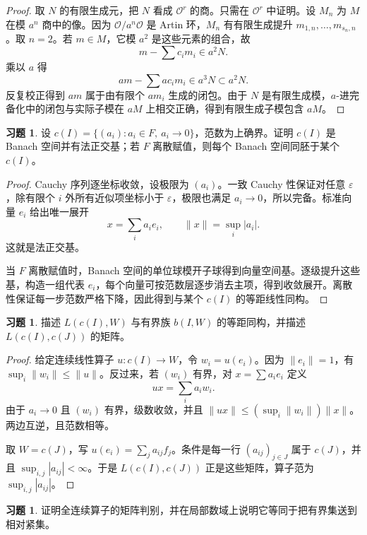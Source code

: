 \documentclass[11pt,a4paper,openany]{ctexbook}
\numberwithin{equation}{chapter}
\theoremstyle{plain}
\theoremstyle{definition}
\newtheorem{exercise}[theorem]{习题}
\theoremstyle{remark}
\begin{document}
\begin{proof}
取 $N$ 的有限生成元，把 $N$ 看成 $\mathcal O^r$ 的商。只需在 $\mathcal O^r$ 中证明。设 $M_n$ 为 $M$ 在模 $a^n$ 商中的像。因为 $\mathcal O/a^n\mathcal O$ 是 Artin 环，$M_n$ 有有限生成提升 $m_{1,n},\ldots,m_{s_n,n}$。取 $n=2$。若 $m\in M$，它模 $a^2$ 是这些元素的组合，故
\[
  m-\sum c_i m_i\in a^2N.
\]
乘以 $a$ 得
\[
  am-\sum ac_i m_i\in a^3N\subset a^2N.
\]
反复校正得到 $am$ 属于由有限个 $am_i$ 生成的闭包。由于 $N$ 是有限生成模，$a$-进完备化中的闭包与实际子模在 $aM$ 上相交正确，得到有限生成子模包含 $aM$。
\end{proof}

\begin{exercise}
设 $c(I)=\{(a_i):a_i\in F,\ a_i\to0\}$，范数为上确界。证明 $c(I)$ 是 Banach 空间并有法正交基；若 $F$ 离散赋值，则每个 Banach 空间同胚于某个 $c(I)$。
\end{exercise}

\begin{proof}
Cauchy 序列逐坐标收敛，设极限为 $(a_i)$。一致 Cauchy 性保证对任意 $\varepsilon$，除有限个 $i$ 外所有近似项坐标小于 $\varepsilon$，极限也满足 $a_i\to0$，所以完备。标准向量 $e_i$ 给出唯一展开
\[
  x=\sum_i a_ie_i,\qquad \|x\|=\sup_i|a_i|.
\]
这就是法正交基。

当 $F$ 离散赋值时，Banach 空间的单位球模开子球得到向量空间基。逐级提升这些基，构造一组代表 $e_i$，每个向量可按范数层逐步消去主项，得到收敛展开。离散性保证每一步范数严格下降，因此得到与某个 $c(I)$ 的等距线性同构。
\end{proof}

\begin{exercise}
描述 $L(c(I),W)$ 与有界族 $b(I,W)$ 的等距同构，并描述 $L(c(I),c(J))$ 的矩阵。
\end{exercise}

\begin{proof}
给定连续线性算子 $u:c(I)\to W$，令 $w_i=u(e_i)$。因为 $\|e_i\|=1$，有 $\sup_i\|w_i\|\le\|u\|$。反过来，若 $(w_i)$ 有界，对 $x=\sum a_ie_i$ 定义
\[
  ux=\sum_i a_iw_i.
\]
由于 $a_i\to0$ 且 $(w_i)$ 有界，级数收敛，并且 $\|ux\|\le(\sup_i\|w_i\|)\|x\|$。两边互逆，且范数相等。

取 $W=c(J)$，写 $u(e_i)=\sum_j a_{ij}f_j$。条件是每一行 $(a_{ij})_{j\in J}$ 属于 $c(J)$，并且 $\sup_{i,j}|a_{ij}|<\infty$。于是 $L(c(I),c(J))$ 正是这些矩阵，算子范为 $\sup_{i,j}|a_{ij}|$。
\end{proof}

\begin{exercise}
证明全连续算子的矩阵判别，并在局部数域上说明它等同于把有界集送到相对紧集。
\end{exercise}
\end{document}
